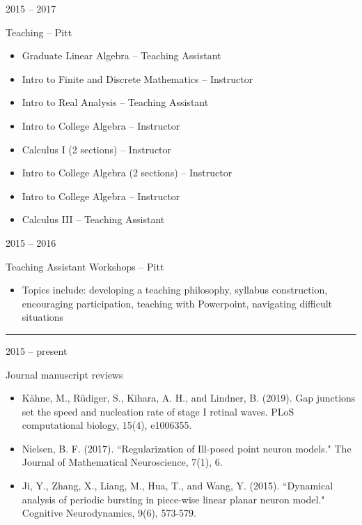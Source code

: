 \documentclass[a4paper,10pt]{article}
\newlength{\cvcolumngapwidth}
\newlength{\cvleftcolumnwidth}
\newlength{\cvrightcolumnwidth}
\newcommand{\cvsectionstyle}[1]{{\normalsize\cvsectionfont\textcolor{cvsectioncolor}{#1}}}
\newcommand{\cvtitlestyle}[1]{{\large\cvtitlefont\textcolor{cvtitlecolor}{#1}}}
\newcommand{\cvheadingstyle}[1]{{\normalsize\cvheadingfont\textcolor{cvheadingcolor}{#1}}}
\newlength{\cvafteritemskipamount}
\newlength{\cvaftersectionskipamount}
\newlength{\cvbetweensectionandheadingextraskipamount}
\newlength{\cvaftertitleskipamount}
\newlength{\cvparskip}
\newcommand{\cvsection}[1]{
            \begin{minipage}[t]{\cvleftcolumnwidth}
                \raggedleft\cvsectionstyle{#1}
            \end{minipage}%
            \hspace{\cvcolumngapwidth}%
            \begin{minipage}[t]{\cvrightcolumnwidth}
                \textcolor{cvrulecolor}{\rule{\cvrightcolumnwidth}{0.3mm}}
            \end{minipage}
        
            \vspace{\cvaftersectionskipamount}
        }
\newcommand{\cvitem}[2]{
            \begin{minipage}[t]{\cvleftcolumnwidth}
                \raggedleft #1
            \end{minipage}%
            \hspace{\cvcolumngapwidth}%
            \begin{minipage}[t]{\cvrightcolumnwidth}
                \setlength{\parskip}{\cvparskip} #2
            \end{minipage}
        
            \vspace{\cvafteritemskipamount}
        }
\newcommand{\cvtitle}[1]{
            \cvtitlestyle{#1}
        
            \vspace{\cvaftertitleskipamount}
            \vspace{-\cvparskip}
        }
\begin{document}
        \cvitem{
            \cvheadingstyle{2015 -- 2017}
        }{
            \cvtitle{Teaching -- Pitt}
            \begin{itemize}[leftmargin=*]
                \item Graduate Linear Algebra -- Teaching Assistant
                	\item Intro to Finite and Discrete Mathematics -- Instructor
        	\item Intro to Real Analysis -- Teaching Assistant
            	\item Intro to College Algebra -- Instructor
            	\item Calculus I (2 sections) -- Instructor
        	\item Intro to College Algebra (2 sections) -- Instructor
        	\item Intro to College Algebra -- Instructor
        	\item Calculus III -- Teaching Assistant
            \end{itemize}
        
        }
        
        \cvitem{
            \cvheadingstyle{2015 -- 2016}
        }{
            \cvtitle{Teaching Assistant Workshops -- Pitt}
            \begin{itemize}[leftmargin=*]
                \item Topics include: developing a teaching philosophy, syllabus construction, encouraging participation, teaching with Powerpoint, navigating difficult situations
            \end{itemize}
            
        }
        
        
        \cvsection{SERVICE}
        \vspace{\cvbetweensectionandheadingextraskipamount}
        
        \cvitem{
            \cvheadingstyle{2015 -- present}
        }{
            \cvtitle{Journal manuscript reviews}
            \begin{itemize}[leftmargin=*]
                	\item K{\"a}hne, M., R{\"u}diger, S., Kihara, A. H., and Lindner, B. (2019). Gap junctions set the speed and nucleation rate of stage I retinal waves. PLoS computational biology, 15(4), e1006355.
        	\item Nielsen, B. F. (2017). ``Regularization of Ill-posed point neuron models." The Journal of Mathematical Neuroscience, 7(1), 6.
        	\item Ji, Y., Zhang, X., Liang, M., Hua, T., and Wang, Y. (2015). ``Dynamical analysis of periodic bursting in piece-wise linear planar neuron model." Cognitive Neurodynamics, 9(6), 573-579.
            \end{itemize}
        
        }
    
\end{document}
